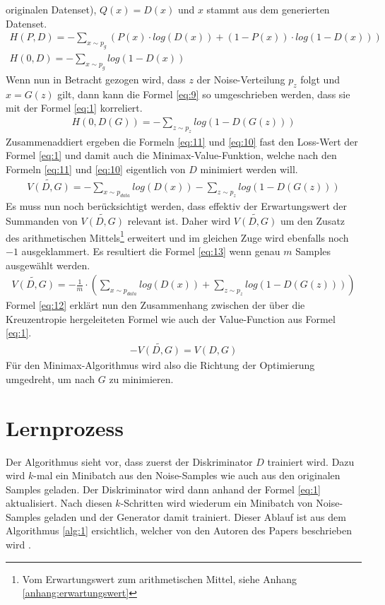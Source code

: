 originalen Datenset), $Q(x) = D(x)$ und $x$ stammt aus dem generierten Datenset.
\begin{align}
    H(P,D) = - \sum_{x \sim p_{g}} (P(x) \cdot log(D(x)) + (1 - P(x)) \cdot log(1 - D(x)))\\
    H(0,D) = - \sum_{x \sim p_{g}} log(1 - D(x)) \label{eq:9}
\end{align}
Wenn nun in Betracht gezogen wird, dass $z$ der Noise-Verteilung $p_z$ folgt und $x = G(z)$ gilt,
dann kann die Formel \ref{eq:9} so umgeschrieben werden, dass sie mit der Formel \ref{eq:1} korreliert.
\begin{align}
    H(0,D(G)) = - \sum_{z \sim p_{z}} log(1 - D(G(z))) \label{eq:10}
\end{align}
Zusammenaddiert ergeben die Formeln \ref{eq:11} und \ref{eq:10} fast den Loss-Wert der Formel \ref{eq:1} und damit auch die Minimax-Value-Funktion,
welche nach den Formeln \ref{eq:11} und \ref{eq:10} eigentlich von $D$ minimiert werden will.
\begin{align}
    \widetilde{V(D,G)} = - \sum_{x \sim p_{data}} log(D(x)) - \sum_{z \sim p_{z}} log(1 - D(G(z)))
\end{align}
Es muss nun noch berücksichtigt werden, dass effektiv der Erwartungswert der Summanden von $\widetilde{V(D,G)}$ relevant ist. Daher
wird $\widetilde{V(D,G)}$ um den Zusatz des arithmetischen Mittels\footnote{Vom Erwartungswert zum arithmetischen Mittel, siehe Anhang \ref{anhang:erwartungswert}} erweitert und im gleichen Zuge wird ebenfalls noch
$-1$ ausgeklammert. Es resultiert die Formel \ref{eq:13} wenn genau $m$ Samples ausgewählt werden.
\begin{align}
    \widetilde{V(D,G)} = - \frac{1}{m} \cdot (\sum_{x \sim p_{data}} log(D(x)) + \sum_{z \sim p_{z}} log(1 - D(G(z))))\label{eq:13}
\end{align}
Formel \ref{eq:12} erklärt nun den Zusammenhang zwischen der über die Kreuzentropie hergeleiteten Formel wie auch der Value-Function aus Formel \ref{eq:1}.
\begin{align}
    -\widetilde{V(D,G)} = V(D,G)\label{eq:12}
\end{align}
Für den Minimax-Algorithmus wird also die Richtung der Optimierung umgedreht, um nach $G$ zu minimieren.

\newpage
\section{Lernprozess}
Der Algorithmus sieht vor, dass zuerst der Diskriminator $D$ trainiert wird. Dazu wird $k$-mal ein Minibatch aus
den Noise-Samples wie auch aus den originalen Samples geladen. Der Diskriminator wird dann anhand der Formel \ref{eq:1}
aktualisiert.
Nach diesen $k$-Schritten wird wiederum ein Minibatch von Noise-Samples geladen und der Generator damit trainiert.
Dieser Ablauf ist aus dem Algorithmus \ref{alg:1} ersichtlich, welcher von den Autoren des Papers beschrieben wird \cite{8253599}.

